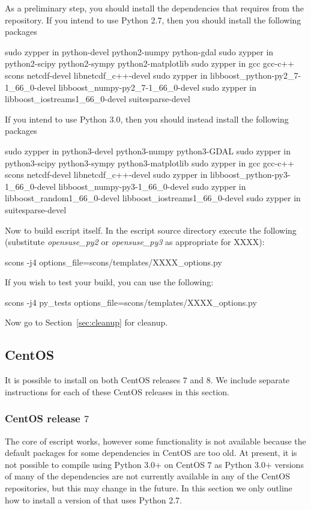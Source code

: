\noindent As a preliminary step, you should install the dependencies that \esfinley requires from the repository.
\noindent  If you intend to use Python 2.7, then you should install the following packages
\begin{shellCode}
sudo zypper in python-devel python2-numpy python-gdal
sudo zypper in python2-scipy python2-sympy python2-matplotlib
sudo zypper in gcc gcc-c++ scons netcdf-devel libnetcdf_c++-devel
sudo zypper in libboost_python-py2_7-1_66_0-devel libboost_numpy-py2_7-1_66_0-devel
sudo zypper in libboost_iostreams1_66_0-devel suitesparse-devel
\end{shellCode}

\noindent If you intend to use Python 3.0, then you should instead install the following packages
\begin{shellCode}
sudo zypper in python3-devel python3-numpy python3-GDAL
sudo zypper in python3-scipy python3-sympy python3-matplotlib
sudo zypper in gcc gcc-c++ scons netcdf-devel libnetcdf_c++-devel
sudo zypper in libboost_python-py3-1_66_0-devel libboost_numpy-py3-1_66_0-devel
sudo zypper in libboost_random1_66_0-devel libboost_iostreams1_66_0-devel
sudo zypper in suitesparse-devel
\end{shellCode}

\noindent Now to build escript itself.
\noindent In the escript source directory execute the following (substitute \textit{opensuse_py2} or \textit{opensuse_py3} as appropriate for XXXX):
\begin{shellCode}
scons -j4 options_file=scons/templates/XXXX_options.py
\end{shellCode}

\noindent If you wish to test your build, you can use the following:
\begin{shellCode}
scons -j4 py_tests options_file=scons/templates/XXXX_options.py
\end{shellCode}

\noindent Now go to Section~\ref{sec:cleanup} for cleanup.

\subsection{CentOS}\label{sec:centossrc}
It is possible to install \escript on both CentOS releases $7$ and $8$. We include separate instructions for each of these CentOS releases in this section.
\subsubsection{CentOS release $7$}
The core of escript works, however some functionality is not available because the default packages for some dependencies in CentOS are too old.
At present, it is not possible to compile \escript using Python 3.0+ on CentOS $7$ as Python 3.0+ versions of many of the dependencies are not currently available in any of the CentOS repositories, but this may change in the future. 
In this section we only outline how to install a version of \escript that uses Python 2.7.

